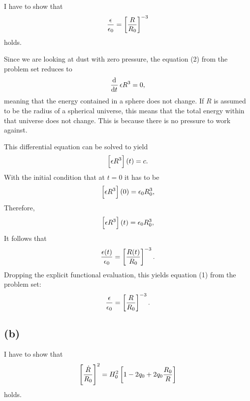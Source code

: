 I have to show that
\[
    \frac{\epsilon}{\epsilon_0} = \sbr{\frac{R}{R_0}}^{-3}
\]
holds.

Since we are looking at dust with zero pressure, the equation (2) from the
problem set reduces to
\[
    \dod{}t \epsilon R^3 = 0,
\]
meaning that the energy contained in a sphere does not change. If $R$ is
assumed to be the radius of a spherical universe, this means that the total
energy within that universe does not change. This is because there is no
pressure to work against.

This differential equation can be solved to yield
\[
    \sbr{\epsilon R^3}(t) = c.
\]
With the initial condition that at $t = 0$ it has to be
\[
    \sbr{\epsilon R^3}(0) = \epsilon_0 R_0^3,
\]
Therefore,
\[
    \sbr{\epsilon R^3}(t) = \epsilon_0 R_0^3,
\]
It follows that
\[
    \frac{\epsilon(t)}{\epsilon_0} = \sbr{\frac{R(t)}{R_0}}^{-3}.
\]
Dropping the explicit functional evaluation, this yields equation (1) from the
problem set:
\[
    \frac{\epsilon}{\epsilon_0} = \sbr{\frac{R}{R_0}}^{-3}.
\]

\subsection*{(b)}

I have to show that
\[
    \sbr{\frac{\dot R}{R_0}}^2 = H_0^2 \sbr{1 - 2 q_0 + 2q_0 \frac{R_0}R}
\]
holds.

